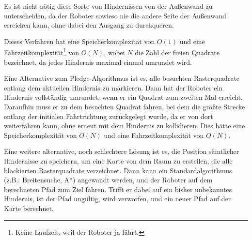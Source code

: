 \documentclass[10pt,a4paper]{article}
\begin{document}
\begin{center}
\end{center}

Es ist nicht nötig diese Sorte von Hindernissen von der Außenwand zu unterscheiden, da der Roboter sowieso nie die andere Seite der Außenwand erreichen kann, ohne dabei den Ausgang zu durchqueren. %

Dieses Verfahren hat eine Speicherkomplexität von $O(1)$ und eine Fahrzeitkomplexität\footnote{Keine Laufzeit, weil der Roboter ja fährt.} von $O(N)$, wobei $N$ die Zahl der freien Quadrate bezeichnet, da jedes Hindernis maximal einmal umrundet wird.

\vspace*{0.5cm}

Eine Alternative zum Pledge-Algorithmus ist es, alle besuchten Rasterquadrate entlang dem aktuellen Hindernis zu markieren. Dann hat der Roboter ein Hindernis vollständig umrundet, wenn er ein Quadrat zum zweiten Mal erreicht. Daraufhin muss er zu dem besuchten Quadrat fahren, bei dem die größte Strecke entlang der initialen Fahrtrichtung zurückgelegt wurde, da er von dort weiterfahren kann, ohne erneut mit dem Hindernis zu kollidieren. %
Dies hätte eine Speicherkomplexität von $O(N)$ und eine Fahrzeitkomplexität von $O(N)$.



\vspace{0.5cm}

Eine weitere alternative, noch schlechtere Lösung ist es, die Position sämtlicher Hindernisse zu speichern, um eine Karte von dem Raum zu erstellen, die alle blockierten Rasterquadrate verzeichnet.  Dann kann ein Standardalgorithmus (z.B.: Breitensuche, A*) angewandt werden, und der Roboter auf dem berechneten Pfad zum Ziel fahren. Trifft er dabei auf ein bisher unbekanntes Hindernis, ist der Pfad ungültig, wird verworfen, und ein neuer Pfad auf der Karte berechnet. 
\end{document}
